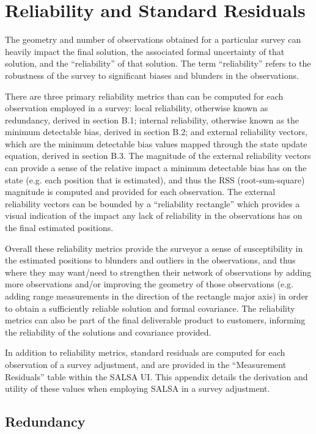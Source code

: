 \chapter{Reliability and Standard Residuals} \label{appendices:RedStdResComp}

The geometry and number of observations obtained for a particular survey can heavily impact the final solution, the associated formal uncertainty of that solution, and the ``reliability'' of that solution. The term ``reliability'' refers to the robustness of the survey to significant biases and blunders in the observations.

There are three primary reliability metrics than can be computed for each observation employed in a survey: local reliability, otherwise known as redundancy, derived in section B.1; internal reliability, otherwise known as the minimum detectable bias, derived in section B.2; and external reliability vectors, which are the minimum detectable bias values mapped through the state update equation, derived in section B.3. The magnitude of the external reliability vectors can provide a sense of the relative impact a minimum detectable bias has on the state (e.g. each position that is estimated), and thus the RSS (root-sum-square) magnitude is computed and provided for each observation. The external reliability vectors can be bounded by a ``reliability rectangle'' which provides a visual indication of the impact any lack of reliability in the observations has on the final estimated positions. 

Overall these reliability metrics provide the surveyor a sense of susceptibility in the estimated positions to blunders and outliers in the observations, and thus where they may want/need to strengthen their network of observations by adding more observations and/or improving the geometry of those observations (e.g. adding range measurements in the direction of the rectangle major axis) in order to obtain a sufficiently reliable solution and formal covariance. The reliability metrics can also be part of the final deliverable product to customers,
informing the reliability of the solutions and covariance provided.

In addition to reliability metrics, standard residuals are computed for each observation of a survey adjustment, and are provided in the ``Measurement Residuals'' table within the SALSA UI. This appendix details the derivation and utility of these values when employing SALSA in a survey adjustment.

\section{Redundancy}

